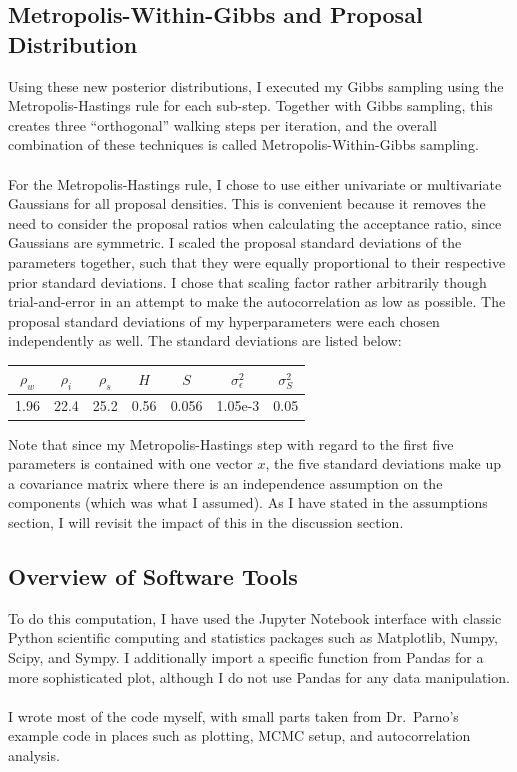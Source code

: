 \documentclass[12pt, letterpaper]{article}
\begin{document}
\subsection{Metropolis-Within-Gibbs and Proposal Distribution}
Using these new posterior distributions, I executed my Gibbs sampling using the Metropolis-Hastings rule for each sub-step.
Together with Gibbs sampling, this creates three ``orthogonal'' walking steps per iteration, and the overall combination of these
techniques is called Metropolis-Within-Gibbs sampling.
\\\\
For the Metropolis-Hastings rule, I chose to use either univariate or multivariate Gaussians for all proposal densities.
This is convenient because it removes the need to consider the proposal ratios when calculating the acceptance ratio,
since Gaussians are symmetric. I scaled the proposal standard deviations of the parameters together,
such that they were equally proportional to their respective prior standard deviations. I chose that scaling factor
rather arbitrarily though trial-and-error in an attempt to make the autocorrelation as low as possible.
The proposal standard deviations of my hyperparameters were each chosen independently as well.
The standard deviations are listed below:
\medskip
\begin{center}
\begin{tabular} { |c|c|c|c|c|c|c| }

\hline
$\rho_w$ & $\rho_i $& $\rho_s$ & $H$ & $S$ & $\sigma^2_\epsilon$ & $\sigma^2_S$ \\
\hline
1.96     & 22.4     & 25.2     &0.56 &0.056&    1.05e-3          & 0.05         \\
\hline

\end{tabular}
\end{center}
\medskip
Note that since my Metropolis-Hastings step with regard to the first five parameters is contained with one vector $x$,
the five standard deviations make up a covariance matrix where there is an independence assumption on the components
(which was what I assumed). As I have stated in the assumptions section, I will revisit the impact of this in the discussion section.


\subsection{Overview of Software Tools}
To do this computation, I have used the Jupyter Notebook interface with classic Python scientific computing and statistics packages
such as Matplotlib, Numpy, Scipy, and Sympy. I additionally import a specific function from Pandas for a more sophisticated plot,
although I do not use Pandas for any data manipulation.
\\\\
I wrote most of the code myself, with small parts taken from Dr.\ Parno's example code in places such as plotting, MCMC setup,
and autocorrelation analysis.
\end{document}

